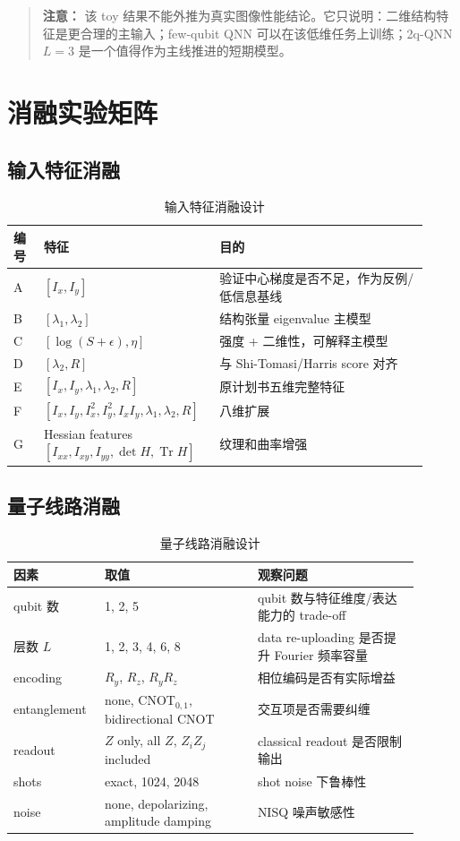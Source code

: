 \documentclass[UTF8,zihao=-4]{ctexart}
\newcommand{\Tr}{\operatorname{Tr}}
\newenvironment{warningbox}{\begin{quote}\small\noindent\textbf{注意：}}{\end{quote}}
\begin{document}
\begin{warningbox}
该 toy 结果不能外推为真实图像性能结论。它只说明：二维结构特征是更合理的主输入；few-qubit QNN 可以在该低维任务上训练；2q-QNN $L=3$ 是一个值得作为主线推进的短期模型。
\end{warningbox}

\section{消融实验矩阵}

\subsection{输入特征消融}

\begin{longtable}{p{0.07\linewidth}p{0.37\linewidth}p{0.48\linewidth}}
\caption{输入特征消融设计}\\
\toprule
编号 & 特征 & 目的 \\
\midrule
A & $[I_x,I_y]$ & 验证中心梯度是否不足，作为反例/低信息基线 \\
B & $[\lambda_1,\lambda_2]$ & 结构张量 eigenvalue 主模型 \\
C & $[\log(S+\epsilon),\eta]$ & 强度 + 二维性，可解释主模型 \\
D & $[\lambda_2,R]$ & 与 Shi-Tomasi/Harris score 对齐 \\
E & $[I_x,I_y,\lambda_1,\lambda_2,R]$ & 原计划书五维完整特征 \\
F & $[I_x,I_y,I_x^2,I_y^2,I_xI_y,\lambda_1,\lambda_2,R]$ & 八维扩展 \\
G & Hessian features $[I_{xx},I_{xy},I_{yy},\det H,\Tr H]$ & 纹理和曲率增强 \\
\bottomrule
\end{longtable}

\subsection{量子线路消融}

\begin{table}[H]
\centering
\caption{量子线路消融设计}
\begin{tabular}{p{0.18\linewidth}p{0.35\linewidth}p{0.37\linewidth}}
\toprule
因素 & 取值 & 观察问题 \\
\midrule
qubit 数 & 1, 2, 5 & qubit 数与特征维度/表达能力的 trade-off \\
层数 $L$ & 1, 2, 3, 4, 6, 8 & data re-uploading 是否提升 Fourier 频率容量 \\
encoding & $R_y$, $R_z$, $R_yR_z$ & 相位编码是否有实际增益 \\
entanglement & none, CNOT$_{0,1}$, bidirectional CNOT & 交互项是否需要纠缠 \\
readout & $Z$ only, all $Z$, $Z_iZ_j$ included & classical readout 是否限制输出 \\
shots & exact, 1024, 2048 & shot noise 下鲁棒性 \\
noise & none, depolarizing, amplitude damping & NISQ 噪声敏感性 \\
\bottomrule
\end{tabular}
\end{table}
\end{document}
